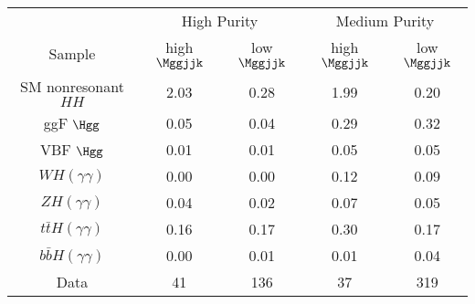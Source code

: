 \begin{tabular}{|c|c|c|c|c|}
\hline
 & \multicolumn{2}{c|}{High Purity} & \multicolumn{2}{c|}{Medium Purity} \\
Sample & high $\Mggjjk$ & low $\Mggjjk$ & high $\Mggjjk$ & low $\Mggjjk$ \\
\hline
SM nonresonant $HH$ & 2.03 & 0.28 & 1.99 & 0.20\\
\hline
ggF $\Hgg$                &  0.05 & 0.04 & 0.29 & 0.32\\
VBF $\Hgg$                &  0.01 & 0.01 & 0.05 & 0.05\\
$WH(\gamma\gamma)$        &  0.00 & 0.00 & 0.12 & 0.09\\     
$ZH(\gamma\gamma)$        &  0.04 & 0.02 & 0.07 & 0.05\\
$t\bar{t}H(\gamma\gamma)$ &  0.16 & 0.17 & 0.30 & 0.17\\
$b\bar{b}H(\gamma\gamma)$ &  0.00 & 0.01 & 0.01 & 0.04\\  
\hline
Data                                  & 41 & 136 & 37 & 319 \\
\hline
\end{tabular}
